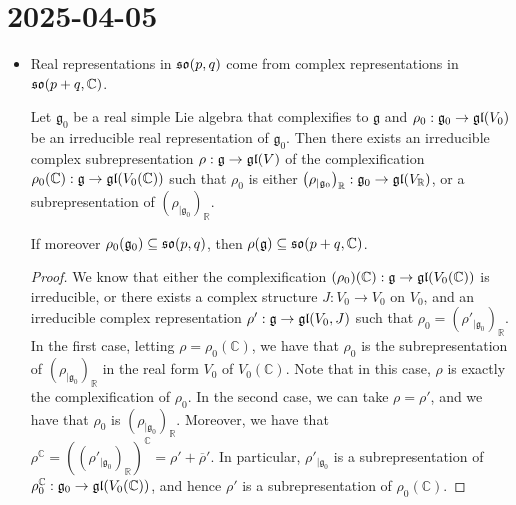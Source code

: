 \documentclass{report}
\begin{document}
\section{2025-04-05}
\begin{itemize}
    \item Real representations in $\operatorname{{\mathfrak{so}}}(p,q)$ come from complex representations in $\operatorname{{\mathfrak{so}}}(p+q, \mathbb C)$.
    \begin{lemma}\label{lem:real_irreducible_representations}
        Let $\mathfrak g_0$ be a real simple Lie algebra that complexifies to $\mathfrak g$ and $\rho_0: \mathfrak g_0 \to \operatorname{{\mathfrak{gl}}}(V_0)$ be an irreducible real representation of $\mathfrak g_0$.
        Then there exists an irreducible complex subrepresentation $\rho: \mathfrak g \to \operatorname{{\mathfrak{gl}}}(V)$ of the complexification $\rho_0(\mathbb C): \mathfrak g \to \operatorname{{\mathfrak{gl}}}(V_0(\mathbb C))$ such that $\rho_0$ is either $\left(\rho_{|\mathfrak g_0}\right)_\mathbb R: \mathfrak g_0 \to \operatorname{{\mathfrak{gl}}}(V_\mathbb R)$, or a subrepresentation of $\left(\rho_{|\mathfrak g_0}\right)_\mathbb R$.
        
        If moreover $\rho_0(\mathfrak g_0) \subseteq \operatorname{{\mathfrak{so}}}(p,q)$, then $\rho(\mathfrak g) \subseteq \operatorname{{\mathfrak{so}}}(p+q, \mathbb C)$.
    \end{lemma}
    \begin{proof}
        We know that either the complexification $(\rho_0)(\mathbb C): \mathfrak g \to \operatorname{{\mathfrak{gl}}}(V_0(\mathbb C))$ is irreducible, or there exists a complex structure $J: V_0 \to V_0$ on $V_0$, and an irreducible complex representation $\rho': \mathfrak g \to \operatorname{{\mathfrak{gl}}}(V_0, J)$ such that $\rho_0 = \left(\rho'_{|\mathfrak g_0}\right)_{\mathbb R}$.
        In the first case, letting $\rho = \rho_0(\mathbb C)$, we have that $\rho_0$ is the subrepresentation of $(\rho_{|\mathfrak g_0})_\mathbb R$ in the real form $V_0$ of $V_0(\mathbb C)$.
        Note that in this case, $\rho$ is exactly the complexification of $\rho_0$.
        In the second case, we can take $\rho = \rho'$, and we have that $\rho_0$ is $(\rho_{|\mathfrak g_0})_\mathbb R$.
        Moreover, we have that $\rho^\mathbb C = ((\rho'_{|\mathfrak g_0})_\mathbb R)^\mathbb C = \rho'+ \overline \rho'$.
        In particular, $\rho'_{|\mathfrak g_0}$ is a subrepresentation of $\rho_0^\mathbb C: \mathfrak g_0 \to \operatorname{{\mathfrak{gl}}}(V_0(\mathbb C))$, and hence $\rho'$ is a subrepresentation of $\rho_0(\mathbb C)$.
        

\end{proof}
\end{itemize}
\end{document}
